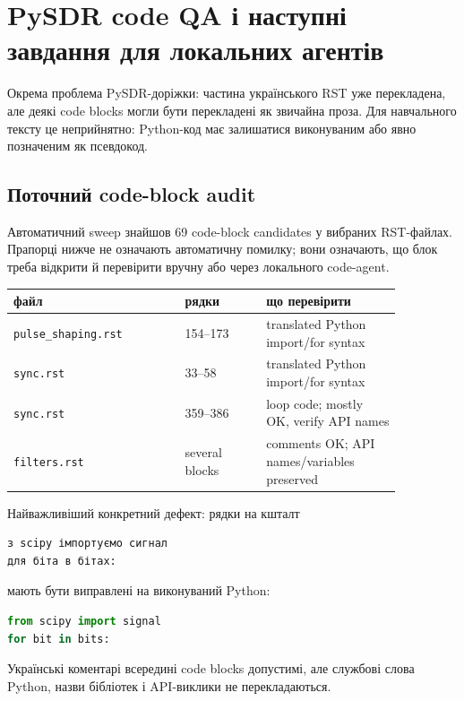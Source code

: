 
\chapter{PySDR code QA і наступні завдання для локальних агентів}
\label{chap:pysdr_code_qa_tasks}

Окрема проблема PySDR-доріжки: частина українського RST уже перекладена, але деякі code blocks могли бути перекладені як звичайна проза. Для навчального тексту це неприйнятно: Python-код має залишатися виконуваним або явно позначеним як псевдокод.

\section{Поточний code-block audit}
Автоматичний sweep знайшов 69 code-block candidates у вибраних RST-файлах. Прапорці нижче не означають автоматичну помилку; вони означають, що блок треба відкрити й перевірити вручну або через локального code-agent.


\begin{longtable}{L{0.38\linewidth}L{0.18\linewidth}L{0.30\linewidth}}
\toprule
файл & рядки & що перевірити \\
\midrule
\endhead
\texttt{pulse\_shaping.rst} & 154--173 & translated Python import/for syntax \\
\texttt{sync.rst} & 33--58 & translated Python import/for syntax \\
\texttt{sync.rst} & 359--386 & loop code; mostly OK, verify API names \\
\texttt{filters.rst} & several blocks & comments OK; API names/variables preserved \\
\bottomrule
\end{longtable}

Найважливіший конкретний дефект: рядки на кшталт
\begin{lstlisting}[language=Python]
з scipy імпортуємо сигнал
для біта в бітах:
\end{lstlisting}
мають бути виправлені на виконуваний Python:
\begin{lstlisting}[language=Python]
from scipy import signal
for bit in bits:
\end{lstlisting}
Українські коментарі всередині code blocks допустимі, але службові слова Python, назви бібліотек і API-виклики не перекладаються.

